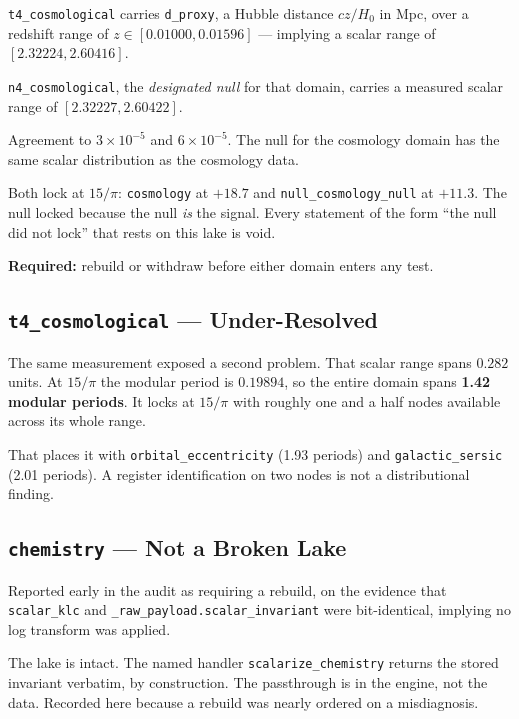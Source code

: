 \documentclass[11pt, letterpaper, openany]{book}
\begin{document}
\texttt{t4\_cosmological} carries \texttt{d\_proxy}, a Hubble distance $cz/H_0$ in Mpc, over a
redshift range of $z \in [0.01000, 0.01596]$ --- implying a scalar range of
$[2.32224, 2.60416]$.

\texttt{n4\_cosmological}, the \emph{designated null} for that domain, carries a measured scalar
range of $[2.32227, 2.60422]$.

\begin{erratumbox}
Agreement to $3\times10^{-5}$ and $6\times10^{-5}$. The null for the cosmology domain has the
same scalar distribution as the cosmology data.

\medskip
\noindent Both lock at $15/\pi$: \texttt{cosmology} at $+18.7$ and \texttt{null\_cosmology\_null}
at $+11.3$. The null locked because the null \emph{is} the signal. Every statement of the form
``the null did not lock'' that rests on this lake is void.
\end{erratumbox}

\textbf{Required:} rebuild or withdraw before either domain enters any test.

\subsection{\texttt{t4\_cosmological} --- Under-Resolved}

The same measurement exposed a second problem. That scalar range spans $0.282$ units. At
$15/\pi$ the modular period is $0.19894$, so the entire domain spans \textbf{1.42 modular
periods}. It locks at $15/\pi$ with roughly one and a half nodes available across its whole
range.

That places it with \texttt{orbital\_eccentricity} (1.93 periods) and \texttt{galactic\_sersic}
(2.01 periods). A register identification on two nodes is not a distributional finding.

\subsection{\texttt{chemistry} --- Not a Broken Lake}

Reported early in the audit as requiring a rebuild, on the evidence that \texttt{scalar\_klc}
and \texttt{\_raw\_payload.scalar\_invariant} were bit-identical, implying no log transform was
applied.

The lake is intact. The named handler \texttt{scalarize\_chemistry} returns the stored invariant
verbatim, by construction. The passthrough is in the engine, not the data. Recorded here because
a rebuild was nearly ordered on a misdiagnosis.
\end{document}
